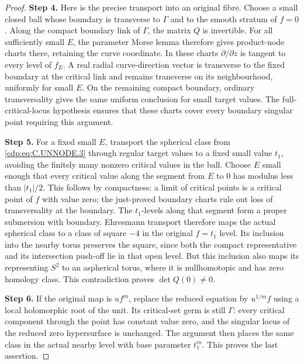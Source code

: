 \begin{proof}
\noindent\textbf{Step 4.} Here is the precise transport into an original
fibre. Choose a small closed ball whose boundary
is transverse to $\Gamma$ and to the smooth
stratum of $f=0$. Along the compact boundary link
of $\Gamma$, the matrix $Q$ is invertible.
For all sufficiently small $E$, the parameter
Morse lemma therefore gives product-node charts
there, retaining the curve coordinate. In these
charts $\partial/\partial z$ is tangent to every
level of $f_E$. A real radial curve-direction
vector is transverse to the fixed boundary at
the critical link and remains transverse on its
neighbourhood, uniformly for small $E$. On the
remaining compact boundary, ordinary transversality
gives the same uniform conclusion for small target
values. The full-critical-locus hypothesis ensures
that these charts cover every boundary singular
point requiring this argument.

\noindent\textbf{Step 5.} For a fixed small $E$, transport the spherical
class from \eqref{cdp:eq:C.UNNODE.3} through regular target values
to a fixed small value $t_1$, avoiding the finitely
many nonzero critical values in the ball. Choose
$E$ small enough that every critical value along
the segment from $E$ to $0$ has modulus less than
$|t_1|/2$. This follows by compactness: a limit of
critical points is a critical point of $f$ with
value zero; the just-proved boundary charts rule
out loss of transversality at the boundary.
The $t_1$-levels along that segment form a proper
submersion with boundary. Ehresmann transport
therefore maps the actual spherical class to a
class of square $-4$ in the original $f=t_1$ level.
Its inclusion into the nearby torus preserves
the square, since both the compact representative
and its intersection push-off lie in that open
level. But this inclusion also maps its representing
$S^2$ to an aspherical torus, where it is
nullhomotopic and has zero homology class. This
contradiction proves $\det Q(0)\ne0$.

\noindent\textbf{Step 6.} If the original map is $u f^m$, replace the reduced
equation by $u^{1/m}f$ using a local holomorphic
root of the unit. Its critical-set germ is still
$\Gamma$: every critical component through the
point has constant value zero, and the singular
locus of the reduced zero hypersurface is unchanged.
The argument then places the
same class in the actual nearby level with base
parameter $t_1^m$. This proves the last assertion.
\end{proof}







